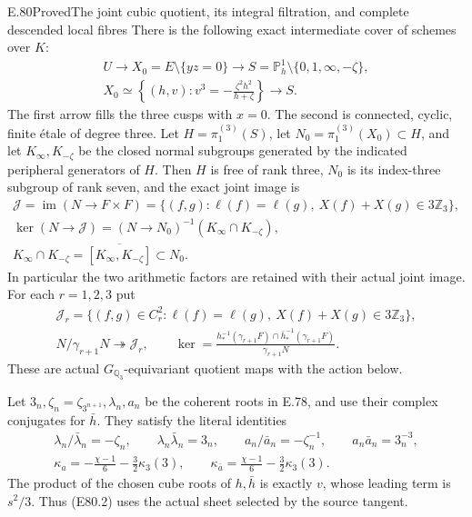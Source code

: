 \begin{statement}{E.80}{Proved}{The joint cubic quotient, its integral filtration, and complete descended local fibres}
There is the following exact intermediate cover of
schemes over $K$:
\[
 \begin{gathered}
 U\longrightarrow X_0=E\setminus\{yz=0\}
   \longrightarrow S=\mathbb P^1_h\setminus\{0,1,\infty,-\zeta\},\\
 X_0\simeq
 \left\{(h,v):v^3=-\frac{\zeta^2h^2}{h+\zeta}\right\}
       \longrightarrow S.
 \end{gathered}
 \tag{E80.2}
\]
The first arrow fills the three cusps with $x=0$.
The second is connected, cyclic, finite \'{e}tale of
degree three. Let $H=\pi_1^{(3)}(S)$, let
$N_0=\pi_1^{(3)}(X_0)\subset H$, and let
$K_\infty,K_{-\zeta}$ be the closed normal subgroups
generated by the indicated peripheral generators of
$H$. Then $H$ is free of rank three, $N_0$ is its
index-three subgroup of rank seven, and the exact
joint image is
\[
 \begin{gathered}
 \mathcal J=\operatorname{im}(N\longrightarrow F\times F)
   =\{(f,g):\ell(f)=\ell(g),\ X(f)+X(g)\in3\mathbb Z_3\},\\
 \ker(N\longrightarrow\mathcal J)
   =(N\longrightarrow N_0)^{-1}(K_\infty\cap K_{-\zeta}),\\
 K_\infty\cap K_{-\zeta}
      =\overline{[K_\infty,K_{-\zeta}]}\subset N_0.
 \end{gathered}
 \tag{E80.3}
\]
In particular the two arithmetic factors are retained
with their actual joint image. For each $r=1,2,3$ put
\[
 \begin{gathered}
 \mathcal J_r=
 \{(f,g)\in C_r^2:\ell(f)=\ell(g),\ X(f)+X(g)\in3\mathbb Z_3\},\\
 N/\gamma_{r+1}N\twoheadrightarrow\mathcal J_r,\qquad
 \ker=
 \frac{h_*^{-1}(\gamma_{r+1}F)\cap
             \bar h_*^{-1}(\gamma_{r+1}F)}{\gamma_{r+1}N}.
 \end{gathered}
 \tag{E80.4}
\]
These are actual $G_{\mathbb Q_3}$-equivariant quotient
maps with the action below.

Let $3_n,\zeta_n=\zeta_{3^{n+1}},\lambda_n,a_n$ be
the coherent roots in E.78, and use their complex
conjugates for $\bar h$. They satisfy the literal
identities
\[
 \begin{gathered}
 \lambda_n/\bar\lambda_n=-\zeta_n,\qquad
 \lambda_n\bar\lambda_n=3_n,\qquad
 a_n/\bar a_n=-\zeta_n^{-1},\qquad
 a_n\bar a_n=3_n^{-3},\\
 \kappa_a=-\frac{\chi-1}{6}-\frac32\kappa_3(3),\qquad
 \kappa_{\bar a}=\frac{\chi-1}{6}-\frac32\kappa_3(3).
 \end{gathered}
 \tag{E80.5}
\]
The product of the chosen cube roots of $h,\bar h$
is exactly $v$, whose leading term is $s^2/3$.
Thus (E80.2) uses the actual sheet selected by the
source tangent.


\end{statement}
